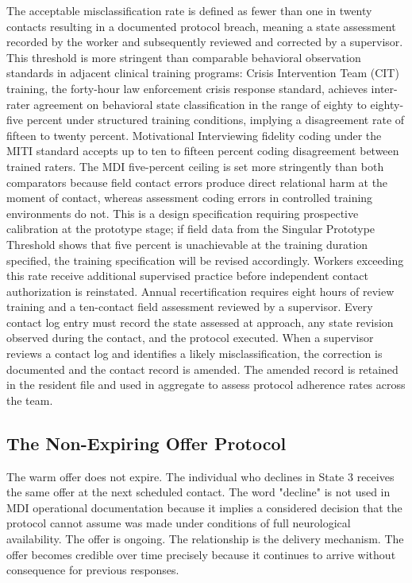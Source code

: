 \documentclass[12pt, letterpaper]{article}
\begin{document}
The acceptable misclassification rate is defined as fewer than one in twenty contacts resulting in a documented protocol breach, meaning a state assessment recorded by the worker and subsequently reviewed and corrected by a supervisor. This threshold is more stringent than comparable behavioral observation standards in adjacent clinical training programs: Crisis Intervention Team (CIT) training, the forty-hour law enforcement crisis response standard, achieves inter-rater agreement on behavioral state classification in the range of eighty to eighty-five percent under structured training conditions, implying a disagreement rate of fifteen to twenty percent. Motivational Interviewing fidelity coding under the MITI standard accepts up to ten to fifteen percent coding disagreement between trained raters. The MDI five-percent ceiling is set more stringently than both comparators because field contact errors produce direct relational harm at the moment of contact, whereas assessment coding errors in controlled training environments do not. This is a design specification requiring prospective calibration at the prototype stage; if field data from the Singular Prototype Threshold shows that five percent is unachievable at the training duration specified, the training specification will be revised accordingly. Workers exceeding this rate receive additional supervised practice before independent contact authorization is reinstated. Annual recertification requires eight hours of review training and a ten-contact field assessment reviewed by a supervisor. Every contact log entry must record the state assessed at approach, any state revision observed during the contact, and the protocol executed. When a supervisor reviews a contact log and identifies a likely misclassification, the correction is documented and the contact record is amended. The amended record is retained in the resident file and used in aggregate to assess protocol adherence rates across the team.

\subsection{The Non-Expiring Offer Protocol}

The warm offer does not expire. The individual who declines in State 3 receives the same offer at the next scheduled contact. The word "decline" is not used in MDI operational documentation because it implies a considered decision that the protocol cannot assume was made under conditions of full neurological availability. The offer is ongoing. The relationship is the delivery mechanism. The offer becomes credible over time precisely because it continues to arrive without consequence for previous responses.
\end{document}
